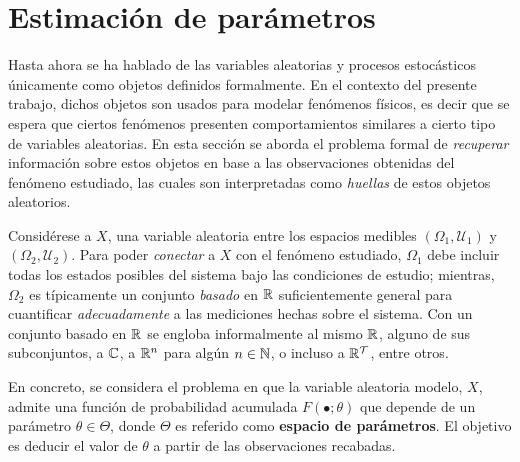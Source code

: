 
\section{Estimación de parámetros}

Hasta ahora se ha hablado de las variables aleatorias y procesos estocásticos únicamente como objetos definidos formalmente.
%
En el contexto del presente trabajo, dichos objetos son usados para modelar fenómenos físicos, es decir que se espera que ciertos fenómenos presenten comportamientos similares a cierto tipo de variables aleatorias.
%
%
En esta sección se aborda el problema formal de \textit{recuperar} información sobre estos objetos en base a las observaciones obtenidas del fenómeno estudiado, las cuales son interpretadas como \textit{huellas} de estos objetos aleatorios.


Considérese a $X$, una variable aleatoria entre los espacios medibles $(\Omega_1,\mathcal{U}_1)$ y $(\Omega_2,\mathcal{U}_2)$. 
%
Para poder \textit{conectar} a $X$ con el fenómeno estudiado, $\Omega_1$ debe incluir todas los estados posibles del sistema bajo las condiciones de estudio; mientras, $\Omega_2$ es típicamente un conjunto \textit{basado} en $\mathbb{R}$ suficientemente general para cuantificar \textit{adecuadamente} a las mediciones hechas sobre el sistema.
%
Con un conjunto basado en $\mathbb{R}$ se engloba informalmente al mismo $\mathbb{R}$, alguno de sus subconjuntos, a $\mathbb{C}$, a $\mathbb{R}^n$ para algún $n\in \mathbb{N}$, o incluso a $\mathbb{R}^\mathcal{T}$, entre otros.

En concreto, se considera el problema en que la variable aleatoria modelo, $X$, admite una función de probabilidad acumulada $F(\bullet; \theta)$ que depende de un parámetro $\theta \in \Theta$, donde $\Theta$ es referido como \textbf{espacio de parámetros}.
%
El objetivo es deducir el valor de $\theta$ a partir de las observaciones recabadas.

